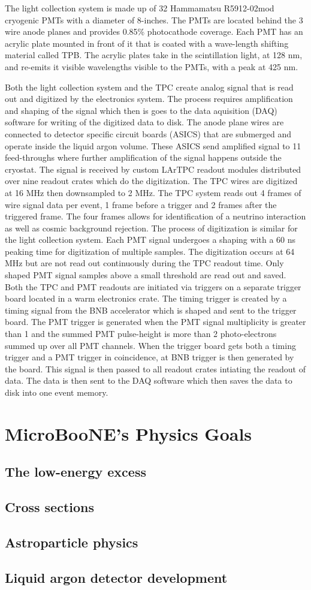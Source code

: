 The light collection system is made up of 32 Hammamatsu R5912-02mod cryogenic PMTs with a diameter of 8-inches. The PMTs are located behind the 3 wire anode planes and provides 0.85\% photocathode coverage. Each PMT has an acrylic plate mounted in front of it that is coated with a wave-length shifting material called TPB. The acrylic plates take in the scintillation light, at 128 nm, and re-emits it visible wavelengths visible to the PMTs, with a peak at 425 nm. 

Both the light collection system and the TPC create analog signal that is read out and digitized by the electronics system. The process requires amplification and shaping of the signal which then is goes to the data aquisition (DAQ) software for writing of the digitized data to disk. The anode plane wires are connected to detector specific circuit boards (ASICS) that are submerged and operate inside the liquid argon volume. These ASICS send amplified signal to 11 feed-throughs where further amplification of the signal happens outside the cryostat. The signal is received by custom LArTPC readout modules distributed over nine readout crates which do the digitization. The TPC wires are digitized at 16 MHz then downsampled to 2 MHz. The TPC system reads out 4 frames of wire signal data per event, 1 frame before a trigger and 2 frames after the triggered frame. The four frames allows for identification of a neutrino interaction as well as cosmic background rejection. The process of digitization is similar for the light collection system. Each PMT signal undergoes a shaping with a 60 ns  peaking time for digitization of multiple samples. The digitization occurs at 64 MHz but are not read out continuously during the TPC readout time. Only shaped PMT signal samples above a small threshold are read out and saved. Both the TPC and PMT readouts are initiated via triggers on a separate trigger board located in a warm electronics crate. The timing trigger is created by a timing signal from the BNB accelerator which is shaped and sent to the trigger board. The PMT trigger is generated when the PMT signal multiplicity is greater than 1 and the summed PMT pulse-height is more than 2 photo-electrons summed up over all PMT channels. When the trigger board gets both a timing trigger and a PMT trigger in coincidence, at BNB trigger is then generated by the board. This signal is then passed to all readout crates intiating the readout of data. The data is then sent to the DAQ software which then saves the data to disk into one event memory.

\section{MicroBooNE's Physics Goals} 
\subsection{The low-energy excess}
\subsection{Cross sections}
\subsection{Astroparticle physics}
\subsection{Liquid argon detector development}
